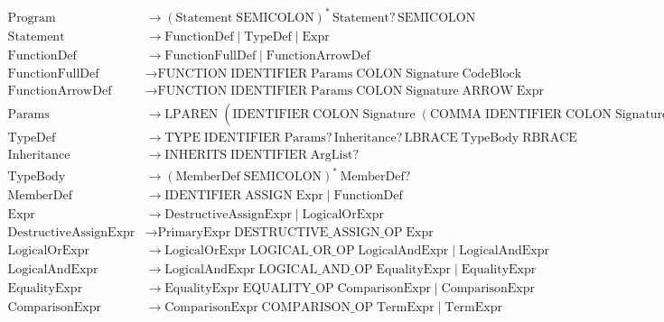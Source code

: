 \documentclass[a4paper,12pt]{article}
\begin{document}
\begin{align*}
\text{Program} &\rightarrow (\text{Statement}\;\text{SEMICOLON})^*\, \text{Statement}?\, \text{SEMICOLON} \\
\text{Statement} &\rightarrow \text{FunctionDef} \mid \text{TypeDef} \mid \text{Expr} \\
\text{FunctionDef} &\rightarrow \text{FunctionFullDef} \mid \text{FunctionArrowDef} \\
\text{FunctionFullDef} &\rightarrow \text{FUNCTION}\; \text{IDENTIFIER}\; \text{Params}\; \text{COLON}\; \text{Signature}\; \text{CodeBlock} \\
\text{FunctionArrowDef} &\rightarrow \text{FUNCTION}\; \text{IDENTIFIER}\; \text{Params}\; \text{COLON}\; \text{Signature}\; \text{ARROW}\; \text{Expr} \\
\text{Params} &\rightarrow \text{LPAREN}\; (\text{IDENTIFIER}\; \text{COLON}\; \text{Signature}\; (\text{COMMA}\; \text{IDENTIFIER}\; \text{COLON}\; \text{Signature})^*)? \text{RPAREN} \\
\text{TypeDef} &\rightarrow \text{TYPE}\; \text{IDENTIFIER}\; \text{Params}?\, \text{Inheritance}?\, \text{LBRACE}\; \text{TypeBody}\; \text{RBRACE} \\
\text{Inheritance} &\rightarrow \text{INHERITS}\; \text{IDENTIFIER}\; \text{ArgList}? \\
\text{TypeBody} &\rightarrow (\text{MemberDef}\; \text{SEMICOLON})^*\, \text{MemberDef}? \\
\text{MemberDef} &\rightarrow \text{IDENTIFIER}\; \text{ASSIGN}\; \text{Expr} \mid \text{FunctionDef} \\
\text{Expr} &\rightarrow \text{DestructiveAssignExpr} \mid \text{LogicalOrExpr} \\
\text{DestructiveAssignExpr} &\rightarrow \text{PrimaryExpr}\; \text{DESTRUCTIVE\_ASSIGN\_OP}\; \text{Expr} \\
\text{LogicalOrExpr} &\rightarrow \text{LogicalOrExpr}\; \text{LOGICAL\_OR\_OP}\; \text{LogicalAndExpr} \mid \text{LogicalAndExpr} \\
\text{LogicalAndExpr} &\rightarrow \text{LogicalAndExpr}\; \text{LOGICAL\_AND\_OP}\; \text{EqualityExpr} \mid \text{EqualityExpr} \\
\text{EqualityExpr} &\rightarrow \text{EqualityExpr}\; \text{EQUALITY\_OP}\; \text{ComparisonExpr} \mid \text{ComparisonExpr} \\
\text{ComparisonExpr} &\rightarrow \text{ComparisonExpr}\; \text{COMPARISON\_OP}\; \text{TermExpr} \mid \text{TermExpr} \\

\end{align*}
\end{document}
